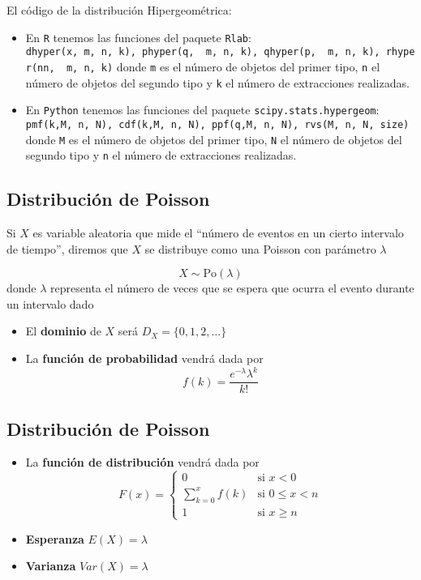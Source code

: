 \documentclass[
]{article}
\providecommand{\tightlist}{%
  \setlength{\itemsep}{0pt}\setlength{\parskip}{0pt}}
\begin{document}
El código de la distribución Hipergeométrica:

\begin{itemize}
\tightlist
\item
  En \texttt{R} tenemos las funciones del paquete \texttt{Rlab}:
  \texttt{dhyper(x,\ m,\ n,\ k),\ phyper(q,\ \ m,\ n,\ k),\ qhyper(p,\ \ m,\ n,\ k),\ rhyper(nn,\ \ m,\ n,\ k)}
  donde \texttt{m} es el número de objetos del primer tipo, \texttt{n}
  el número de objetos del segundo tipo y \texttt{k} el número de
  extracciones realizadas.
\item
  En \texttt{Python} tenemos las funciones del paquete
  \texttt{scipy.stats.hypergeom}:
  \texttt{pmf(k,M,\ n,\ N),\ cdf(k,M,\ n,\ N),\ ppf(q,M,\ n,\ N),\ rvs(M,\ n,\ N,\ size)}
  donde \texttt{M} es el número de objetos del primer tipo, \texttt{N}
  el número de objetos del segundo tipo y \texttt{n} el número de
  extracciones realizadas.
\end{itemize}

\hypertarget{distribuciuxf3n-de-poisson}{%
\subsection{Distribución de Poisson}\label{distribuciuxf3n-de-poisson}}

Si \(X\) es variable aleatoria que mide el ``número de eventos en un
cierto intervalo de tiempo'', diremos que \(X\) se distribuye como una
Poisson con parámetro \(\lambda\)

\[X\sim \text{Po}(\lambda)\] donde \(\lambda\) representa el número de
veces que se espera que ocurra el evento durante un intervalo dado

\begin{itemize}
\item
  El \textbf{dominio} de \(X\) será \(D_X = \{0,1,2,\dots\}\)
\item
  La \textbf{función de probabilidad} vendrá dada por
  \[f(k) = \frac{e^{-\lambda}\lambda^k}{k!}\]
\end{itemize}

\hypertarget{distribuciuxf3n-de-poisson-1}{%
\subsection{Distribución de
Poisson}\label{distribuciuxf3n-de-poisson-1}}

\begin{itemize}
\tightlist
\item
  La \textbf{función de distribución} vendrá dada por \[F(x) = \left\{
  \begin{array}{cl}
     0 & \text{si } x<0 
  \\ \sum_{k=0}^xf(k) & \text{si } 0\le x<n
  \\ 1 & \text{si } x\ge n
  \end{array}
  \right.\]
\item
  \textbf{Esperanza} \(E(X) = \lambda\)
\item
  \textbf{Varianza} \(Var(X) = \lambda\)
\end{itemize}
\end{document}
